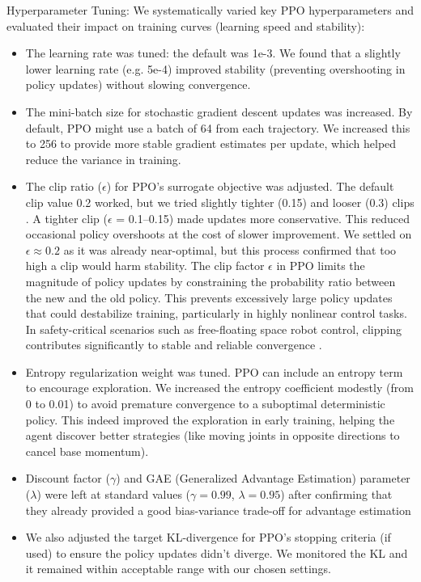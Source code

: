 \documentclass{ieeeaccess}
\begin{document}
Hyperparameter Tuning: We systematically varied key PPO hyperparameters and evaluated their
impact on training curves (learning speed and stability):
\begin{itemize}
  \item The learning rate was tuned: the default was 1e-3. We found that a slightly lower learning rate
(e.g. 5e-4) improved stability (preventing overshooting in policy updates) without  slowing
convergence.
  \item The mini-batch size for stochastic gradient descent updates was increased. By default, PPO
might use a batch of 64 from each trajectory. We increased this to 256 to provide more stable
gradient estimates per update, which helped reduce the variance in training.
  \item The clip ratio ($\epsilon$) for PPO’s surrogate objective was adjusted. The default clip value 0.2 worked,
but we tried slightly tighter (0.15) and looser (0.3) clips \cite{b15}. A tighter clip ($\epsilon$ = 0.1–0.15) made updates
more conservative. This reduced occasional policy overshoots at the cost of slower improvement.
We settled on $\epsilon\approx0.2$ as it was already near-optimal, but this process confirmed that too high a
clip would harm stability. The clip factor $\epsilon$ in PPO limits the magnitude of policy updates by constraining 
the probability ratio between the new and the old policy. This prevents excessively large policy updates that could 
destabilize training, particularly in highly nonlinear control tasks. In safety-critical scenarios such as free-floating 
space robot control, clipping contributes significantly to stable and reliable convergence \cite{b4,b15}.
  \item Entropy regularization weight was tuned. PPO can include an entropy term to encourage
exploration. We increased the entropy coefficient modestly (from 0 to 0.01) to avoid premature
convergence to a suboptimal deterministic policy. This indeed improved the exploration in early
training, helping the agent discover better strategies (like moving joints in opposite directions to
cancel base momentum).
  \item Discount factor ($\gamma$) and GAE (Generalized Advantage Estimation) parameter ($\lambda$) were left at
standard values ($\gamma = 0.99$, $\lambda = 0.95$) after confirming that they already provided a good bias-variance trade-off for advantage estimation
  \item We also adjusted the target KL-divergence for PPO’s stopping criteria (if used) to ensure the
policy updates didn’t diverge. We monitored the KL and it remained within acceptable
{range with our chosen settings.}
\end{itemize}
\end{document}
